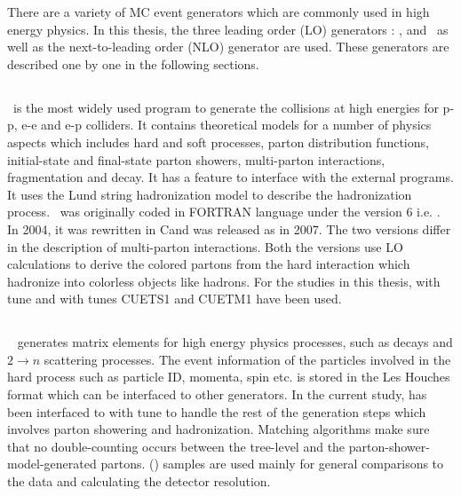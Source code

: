 There are a variety of MC event generators which are commonly used in high energy physics. In this thesis, the three leading order (LO) generators : \PYTHIA, \MadGraphF and \HERWIG~as well as the next-to-leading order (NLO) generator \POWHEG are used. These generators are described one by one in the following sections.

\subsection{\PYTHIA}
\PYTHIA~is the most widely used program to generate the collisions at high energies for p-p, e-e and e-p colliders. It contains theoretical models for a number of physics aspects which includes hard and soft processes, parton distribution functions, initial-state and final-state parton showers, multi-parton interactions, fragmentation and decay. It has a feature to interface with the external programs. It uses the Lund string hadronization model \cite{Lund} to describe the hadronization process. \PYTHIA~was originally coded in FORTRAN language under the version 6 i.e. \PYTHIAS \cite{Sjostrand:2006za}. In 2004, it was rewritten in C\plusn\plus and was released as \PYTHIAE \cite{Sjostrand:2007gs} in 2007. The two versions differ in the description of multi-parton interactions. Both the versions use LO calculations to derive the colored partons from the hard interaction which hadronize into colorless objects like hadrons. For the studies in this thesis, \PYTHIAS with tune \Ztwostar \cite{Field:2011iq} and \PYTHIAE with tunes CUETS1 and CUETM1 \cite{Khachatryan:2015pea} have been used. 

\subsection{\MadGraphF}
\MadGraphF~\cite{Alwall:2011uj} generates matrix elements for high energy physics processes, such as decays and $2 \rightarrow n$ scattering processes. The event information of the particles involved in the hard process such as particle ID, momenta, spin etc. is stored in the Les Houches format \cite{Alwall:2006yp} which can be interfaced to other generators. In the current study, \MadGraphF has been interfaced to \PYTHIAS with tune \Ztwostar to handle the rest of the generation steps which involves parton showering and hadronization. Matching algorithms make sure that no double-counting occurs between the tree-level and the parton-shower-model-generated partons. \MadGraphFn\plusn \PYTHIAS (\MGP) samples are used mainly for general comparisons to the data and calculating the detector resolution. 

